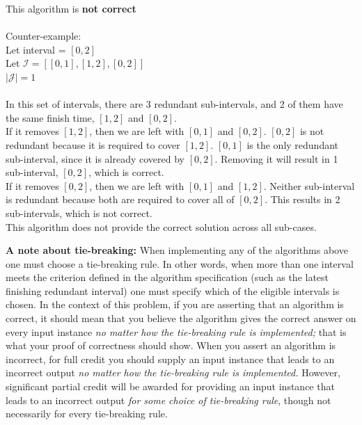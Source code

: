 \documentclass{hw_template}
\begin{document}
\begin{problem}
\begin{solution}
This algorithm is \textbf{not correct}\\\\
Counter-example:\\
Let interval = $[0,2]$\\
Let $\mathcal{I} = [[0,1], [1,2], [0,2]]$\\
$|\mathcal{J}| = 1$\\\\
In this set of intervals, there are 3 redundant sub-intervals, and 2 of them have the same finish time, $[1,2]$ and $[0,2]$.\\
If it removes $[1,2]$, then we are left with $[0,1]$ and $[0,2]$. $[0,2]$ is not redundant because it is required to cover
$[1,2]$. $[0,1]$ is the only redundant sub-interval, since it is already covered by $[0,2]$. Removing it will result 
in 1 sub-interval, $[0,2]$, which is correct.\\
If it removes $[0,2]$, then we are left with $[0,1]$ and $[1,2]$. Neither sub-interval is redundant because both are required 
to cover all of $[0,2]$. This results in 2 sub-intervals, which is not correct.\\
This algorithm does not provide the correct solution across all sub-cases.
\end{solution}

{\bf A note about tie-breaking:}
When implementing any of the algorithms above one must
choose a tie-breaking rule. In other words, when more than
one interval meets the criterion defined in the algorithm
specification (such as the latest finishing redundant
interval) one must specify which of the eligible
intervals is chosen. In the context of this problem,
if you are asserting that an algorithm is correct,
it should mean that you believe the algorithm gives
the correct answer on every input instance
{\em no matter how the tie-breaking rule is implemented;}
that is what your proof of correctness should show.
When you assert an algorithm is incorrect,
for full credit you should supply an input instance
that leads to an incorrect output {\em no matter how
the tie-breaking rule is implemented.} However,
significant partial credit will be awarded for
providing an input instance that leads to an incorrect
output {\em for some choice of tie-breaking rule},
though not necessarily for every tie-breaking rule.


\end{problem}
\newpage
\end{document}
